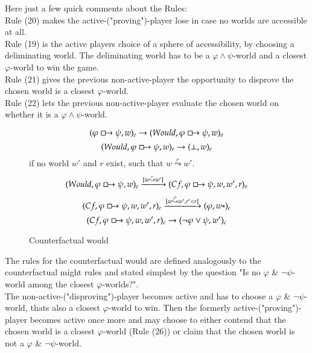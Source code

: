 \documentclass[a4paper,american]{paper}
\begin{document}
	Here just a few quick comments about the Rules: \\
	Rule (20) makes the active-("proving")-player lose in case no worlds are accessible at all. \\
	Rule (19) is the active players choice of a sphere of accessibility, by choosing a deliminating world. The deliminating world has to be a $\varphi\wedge\psi$-world and a closest $\varphi$-world to win the game.\\
	Rule (21) gives the previous non-active-player the opportunity to disprove the chosen world is a closest $\varphi$-world. \\
	Rule (22) lets the previous non-active-player evaluate the chosen world on whether it is a $\varphi\wedge\psi$-world.
\begin{figure}[H]
	\centering
	\begin{equation}
		(\varphi\boxright\psi ,w)_e\rightarrow (Would,\varphi\boxright\psi ,w)_o
	\end{equation}
	\begin{equation}
		(Would,\varphi\boxright\psi ,w)_e\rightarrow (\bot ,w)_e
	\end{equation}
	if no world $w'$ and $r$ exist, such that $w\overset{r}{\leadsto}w'$.
	\begin{equation}
		(Would,\varphi\boxright\psi ,w)_e\xrightarrow{[w\overset{r}{\leadsto}w']} (Cf,\varphi\boxright\psi ,w,w',r)_o
	\end{equation}
	\begin{equation}
		(Cf,\varphi\boxright\psi ,w,w',r)_e\xrightarrow{[w\overset{r^*}{\leadsto}w^*,r^*< r]} (\varphi ,w*)_e
	\end{equation}
	\begin{equation}
		(Cf,\varphi\boxright\psi ,w,w',r)_e\rightarrow (\neg\varphi\vee\psi ,w')_e
	\end{equation}
	\caption{Counterfactual would}
	\label{fig:counterfactual_would_rules}
\end{figure}
	The rules for the counterfactual would are defined analogously to the counterfactual might rules and stated simplest by the question "Is no $\varphi$ \& $\neg\psi$-world among the closest $\varphi$-worlds?". \\
	The non-active-("disproving")-player becomes active and has to choose a $\varphi$ \& $\neg\psi$-world, thats also a closest $\varphi$-world to win. Then the formerly active-("proving")-player becomes active once more and may choose to either contend that the chosen world is a closest $\varphi$-world (Rule (26)) or claim that the chosen world is not a $\varphi$ \& $\neg\psi$-world. \\
\end{document}
